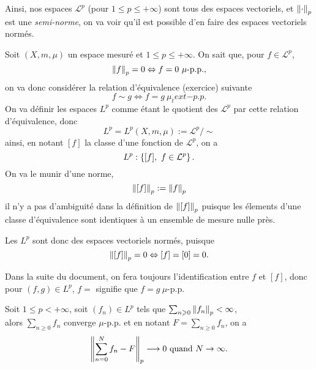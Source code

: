 \documentclass[a4paper,11pt, twoside]{article}
\begin{document}
Ainsi, nos espaces $\mathcal L^p$ (pour $1\leqslant p\leqslant +\infty$) sont tous des espaces vectoriels, et $\left\lVert\cdot\right\rVert_p$ est une \emph{semi-norme}, on va voir qu'il est possible d'en faire des espaces vectoriels normés.



Soit $(X,m,\mu)$ un espace mesuré et $1\leqslant p\leqslant +\infty$. On sait que, pour $f\in\mathcal L^p$, 
$$\norm{f}_p=0\Leftrightarrow f=0\ \mu\text{-p.p.},$$
on va donc considérer la relation d'équivalence (exercice) suivante
$$f\sim g \Leftrightarrow f=g\ \mu_text{-p.p.}$$
On va définir les espaces $L^p$ comme étant le quotient des $\mathcal L^p$ par cette relation d'équivalence, donc 
$$L^p=L^p(X,m,\mu):=\mathcal L^p/\sim$$
ainsi, en notant $[f]$ la classe d'une fonction de $\mathcal L^p$, on a 
$$L^p:\left\{[f],\ f\in\mathcal L^p\right\}.$$
On va le munir d'une norme, 
$$\left\lVert[f]\right\rVert_p:=\left\lVert f\right\rVert_p$$
il n'y a pas d'ambiguité dans la définition de $\left\lVert[f]\right\rVert_p$ puisque les élements d'une classe d'équivalence sont identiques à un ensemble de mesure nulle près.

Les $L^p$ sont donc des espaces vectoriels normés, puisque 
$$\left\lVert[f]\right\rVert_p=0\Leftrightarrow [f]=[0]=0.$$

Dans la suite du document, on fera toujours l'identification entre $f$ et $[f]$, donc pour $(f,g)\in L^p$, $f=$ signifie que $f=g\ \mu$-p.p.


\begin{Th}
  Soit $1\leqslant p<+\infty$, soit $(f_n)\in L^p$ tels que $\sum_{n\geqslant 0}\left\lVert f_n\right\rVert_p<\infty$,\\

  alors $\sum_{n\geqslant 0}f_n$ converge $\mu$-p.p. et en notant $F=\sum_{n\geqslant 0}f_n$, on a 
  $$\left\lVert\sum_{n= 0}^Nf_n-F\right\rVert_p\longrightarrow 0\text{ quand }N\to\infty.$$
\end{Th}
\end{document}
